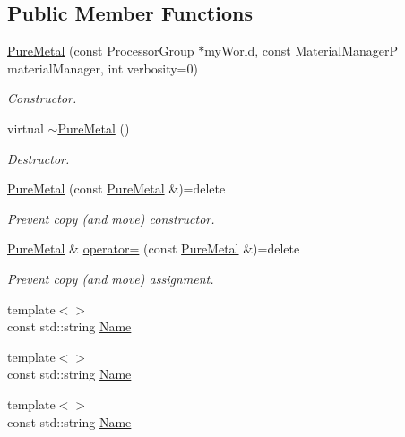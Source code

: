 \subsection*{Public Member Functions}
\begin{DoxyCompactItemize}
\item 
\hyperlink{classUintah_1_1PhaseField_1_1PureMetal_ad70f45a050194475a4dd23237cb6e3ea}{Pure\+Metal} (const Processor\+Group $\ast$my\+World, const Material\+ManagerP material\+Manager, int verbosity=0)
\begin{DoxyCompactList}\small\item\em Constructor. \end{DoxyCompactList}\item 
virtual \hyperlink{classUintah_1_1PhaseField_1_1PureMetal_a2c78cff105c802b5056fc524d557fdeb}{$\sim$\+Pure\+Metal} ()
\begin{DoxyCompactList}\small\item\em Destructor. \end{DoxyCompactList}\item 
\hyperlink{classUintah_1_1PhaseField_1_1PureMetal_af3d049a7d16a892435e2b613fefb6286}{Pure\+Metal} (const \hyperlink{classUintah_1_1PhaseField_1_1PureMetal}{Pure\+Metal} \&)=delete
\begin{DoxyCompactList}\small\item\em Prevent copy (and move) constructor. \end{DoxyCompactList}\item 
\hyperlink{classUintah_1_1PhaseField_1_1PureMetal}{Pure\+Metal} \& \hyperlink{classUintah_1_1PhaseField_1_1PureMetal_aeaab635605e3741a522eae4a6be245ee}{operator=} (const \hyperlink{classUintah_1_1PhaseField_1_1PureMetal}{Pure\+Metal} \&)=delete
\begin{DoxyCompactList}\small\item\em Prevent copy (and move) assignment. \end{DoxyCompactList}\item 
{\footnotesize template$<$$>$ }\\const std\+::string \hyperlink{classUintah_1_1PhaseField_1_1PureMetal_a4058e69cb207dec1c2c3cd38c803ff7e}{Name}
\item 
{\footnotesize template$<$$>$ }\\const std\+::string \hyperlink{classUintah_1_1PhaseField_1_1PureMetal_a3692f58cb41a221762b16bab9c41240d}{Name}
\item 
{\footnotesize template$<$$>$ }\\const std\+::string \hyperlink{classUintah_1_1PhaseField_1_1PureMetal_ab01bb77d0857a9ddf43938a5a2b05792}{Name}

\end{DoxyCompactItemize}
